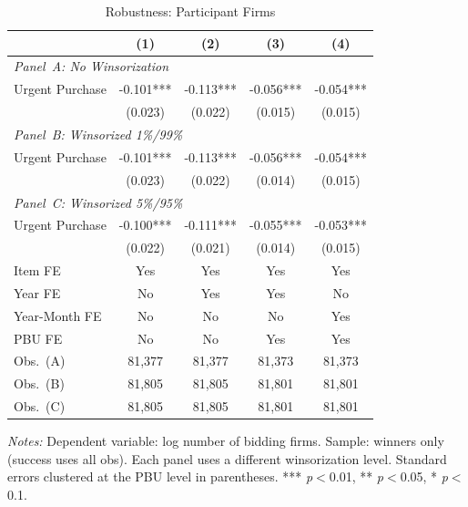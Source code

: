 \begin{table}[ht]
  \centering
  \caption{Robustness: Participant Firms}
  \label{tab:rob_firms}
  \small
  \begin{threeparttable}
  \begin{tabular}{lcccc}
    \hline\hline
    & (1) & (2) & (3) & (4) \\
    \hline
    \multicolumn{5}{l}{\textit{Panel~A: No Winsorization}} \\[3pt]
    Urgent Purchase & -0.101*** & -0.113*** & -0.056*** & -0.054*** \\
     & (0.023) & (0.022) & (0.015) & (0.015) \\[3pt]
    \hline
    \multicolumn{5}{l}{\textit{Panel~B: Winsorized 1\%/99\%}} \\[3pt]
    Urgent Purchase & -0.101*** & -0.113*** & -0.056*** & -0.054*** \\
     & (0.023) & (0.022) & (0.014) & (0.015) \\[3pt]
    \hline
    \multicolumn{5}{l}{\textit{Panel~C: Winsorized 5\%/95\%}} \\[3pt]
    Urgent Purchase & -0.100*** & -0.111*** & -0.055*** & -0.053*** \\
     & (0.022) & (0.021) & (0.014) & (0.015) \\[3pt]
    \hline
    Item FE & Yes & Yes & Yes & Yes \\
    Year FE & No & Yes & Yes & No \\
    Year-Month FE & No & No & No & Yes \\
    PBU FE & No & No & Yes & Yes \\
    Obs.\ (A) & 81,377 & 81,377 & 81,373 & 81,373 \\
    Obs.\ (B) & 81,805 & 81,805 & 81,801 & 81,801 \\
    Obs.\ (C) & 81,805 & 81,805 & 81,801 & 81,801 \\
    \hline\hline
  \end{tabular}
  \begin{tablenotes}
    \small
    \item \textit{Notes:} Dependent variable: log number of bidding firms. Sample: winners only (success uses all obs). Each panel uses a different winsorization level. Standard errors clustered at the PBU level in parentheses. *** \textit{p}$<$0.01, ** \textit{p}$<$0.05, * \textit{p}$<$0.1.
  \end{tablenotes}
  \end{threeparttable}
\end{table}
